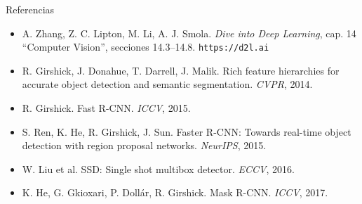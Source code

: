 \documentclass[aspectratio=169, 10pt]{beamer}
\begin{document}
\begin{frame}{Referencias}
	\small
	\begin{itemize}
		\item A. Zhang, Z. C. Lipton, M. Li, A. J. Smola. \textit{Dive into Deep Learning}, cap. 14 ``Computer Vision'', secciones 14.3--14.8. \texttt{https://d2l.ai}
		\item R. Girshick, J. Donahue, T. Darrell, J. Malik. Rich feature hierarchies for accurate object detection and semantic segmentation. \textit{CVPR}, 2014.
		\item R. Girshick. Fast R-CNN. \textit{ICCV}, 2015.
		\item S. Ren, K. He, R. Girshick, J. Sun. Faster R-CNN: Towards real-time object detection with region proposal networks. \textit{NeurIPS}, 2015.
		\item W. Liu et al. SSD: Single shot multibox detector. \textit{ECCV}, 2016.
		\item K. He, G. Gkioxari, P. Dollár, R. Girshick. Mask R-CNN. \textit{ICCV}, 2017.
	\end{itemize}
\end{frame}
\end{document}
